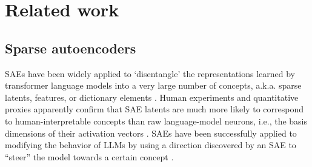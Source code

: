 \section{Related work}

\subsection{Sparse autoencoders}

SAEs have been widely applied to `disentangle' the representations learned by transformer language models into a very large number of concepts, a.k.a. sparse latents, features, or dictionary elements
\citep{sharkey_taking_2022,cunningham_sparse_2023,bricken_monosemanticity_2023,gao_scaling_2024,rajamanoharan_jumping_2024,lieberum_gemma_2024}.
Human experiments and quantitative proxies apparently confirm that SAE latents are much more likely to correspond to human-interpretable concepts than raw language-model neurons, i.e., the basis dimensions of their activation vectors \citep{cunningham_sparse_2023,bricken_monosemanticity_2023,rajamanoharan_improving_2024}.
SAEs have been successfully applied to modifying the behavior of LLMs by using a direction discovered by an SAE to ``steer'' the model towards a certain concept \citep{makelov_sparse_2024,obrien_steering_2024,templeton_scaling_2024}.



